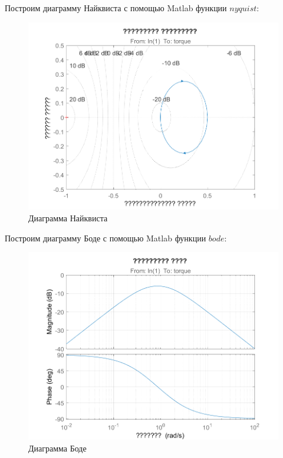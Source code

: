\documentclass[14pt,a4paper,report]{report}
\begin{document}
\clearpage

Построим диаграмму Найквиста с помощью Matlab функции $nyquist$:

\begin{figure}[h!]
	\centering
	\includegraphics[scale = 0.70]{images/nyquist.png}
	\caption{Диаграмма Найквиста}
	\label{image:3}
\end{figure}

Построим диаграмму Боде с помощью Matlab функции $bode$:

\begin{figure}[h!]
	\centering
	\includegraphics[scale = 0.70]{images/bode.png}
	\caption{Диаграмма Боде}
	\label{image:4}
\end{figure}
\end{document}
